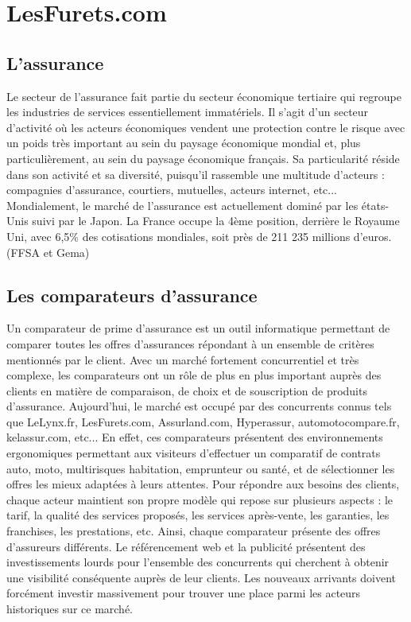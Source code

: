\chapter{LesFurets.com}

\section{L'assurance}
Le secteur de l’assurance fait partie du secteur économique tertiaire qui regroupe les industries de services essentiellement immatériels. Il s’agit d’un secteur d’activité où les acteurs économiques vendent une protection contre le risque avec un poids très important au sein du paysage économique mondial et, plus particulièrement, au sein du paysage économique français. Sa particularité réside dans son activité et sa diversité, puisqu'il rassemble une multitude d’acteurs : compagnies d’assurance, courtiers, mutuelles, acteurs internet, etc... Mondialement, le marché de l’assurance est actuellement dominé par les états-Unis suivi par le Japon. La France occupe la 4ème position, derrière le Royaume Uni, avec 6,5\% des cotisations mondiales, soit près de 211 235 millions d’euros. (FFSA et Gema)

\section{Les comparateurs d'assurance} Un comparateur de prime d’assurance est un outil informatique permettant de comparer toutes les offres d’assurances répondant à un ensemble de critères mentionnés par le client. Avec un marché fortement concurrentiel et très complexe, les comparateurs ont un rôle de plus en plus important auprès des clients en matière de comparaison, de choix et de souscription de produits d’assurance. Aujourd’hui, le marché est occupé par des concurrents connus tels que LeLynx.fr, LesFurets.com, Assurland.com, Hyperassur, automotocompare.fr, kelassur.com, etc... En effet, ces comparateurs présentent des environnements ergonomiques permettant aux visiteurs d’effectuer un comparatif de contrats auto, moto, multirisques habitation, emprunteur ou santé, et de sélectionner les offres les mieux adaptées à leurs attentes. Pour répondre aux besoins des clients, chaque acteur maintient son propre modèle qui repose sur plusieurs aspects : le tarif, la qualité des services proposés, les services après-vente, les garanties, les franchises, les prestations, etc. Ainsi, chaque comparateur présente des offres d’assureurs différents. Le référencement web et la publicité présentent des investissements lourds pour l’ensemble des concurrents qui cherchent à obtenir une visibilité conséquente auprès de leur clients. Les nouveaux arrivants doivent forcément investir massivement pour trouver une place parmi les acteurs historiques sur ce marché.

